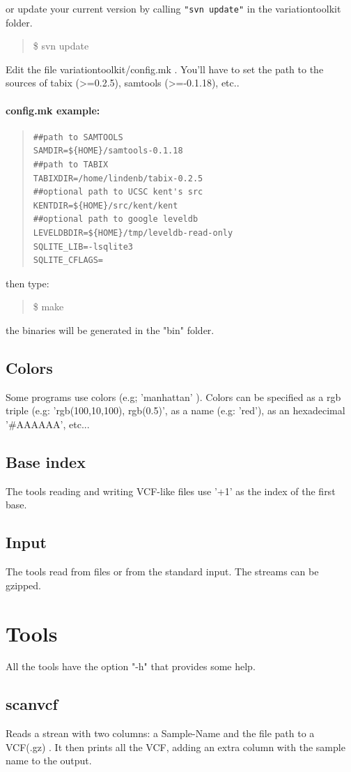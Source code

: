 \documentclass[12pt]{article}
\begin{document}
or update your current version by calling \texttt{"svn update"} in the  variationtoolkit folder.
\begin{quote} 
\$ svn update
\end{quote}

Edit the file variationtoolkit/config.mk . You'll have to set the path to the sources of tabix (>=0.2.5), samtools (>=-0.1.18), etc..
\paragraph{config.mk example:}
\begin{quote}
\begin{verbatim}
##path to SAMTOOLS
SAMDIR=${HOME}/samtools-0.1.18
##path to TABIX
TABIXDIR=/home/lindenb/tabix-0.2.5
##optional path to UCSC kent's src
KENTDIR=${HOME}/src/kent/kent
##optional path to google leveldb
LEVELDBDIR=${HOME}/tmp/leveldb-read-only
SQLITE_LIB=-lsqlite3
SQLITE_CFLAGS=
\end{verbatim}
\end{quote}

then type:
\begin{quote}
\$ make
\end{quote}
the binaries will be generated in the "bin" folder.

\subsection{Colors}
Some programs use colors (e.g; 'manhattan' ). Colors can be specified as a rgb triple (e.g: 'rgb(100,10,100), rgb(0.5)', as a name (e.g: 'red'), as an hexadecimal '\#AAAAAA', etc...
\subsection{Base index}
The tools reading and writing VCF-like files use '+1' as the index of the first base.
\subsection{Input}
The tools read from files or from the standard input. The streams can be gzipped.

\section{Tools}
All the tools have the option "-h" that provides some help.


\subsection{scanvcf}
Reads a strean with two columns: a Sample-Name and the file path to a VCF(.gz) . It then prints all the VCF, adding an extra column with the sample name to the output.
\end{document}
